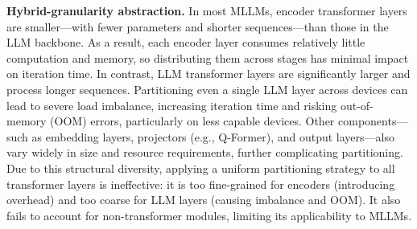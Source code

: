 \documentclass[conference]{IEEEtran}
\begin{document}
\textbf{Hybrid-granularity abstraction.}
In most MLLMs, encoder transformer layers are smaller—with fewer parameters and shorter sequences—than those in the LLM backbone. As a result, each encoder layer consumes relatively little computation and memory, so distributing them across stages has minimal impact on iteration time.
In contrast, LLM transformer layers are significantly larger and process longer sequences. Partitioning even a single LLM layer across devices can lead to severe load imbalance, increasing iteration time and risking out-of-memory (OOM) errors, particularly on less capable devices.
Other components—such as embedding layers, projectors (e.g., Q-Former), and output layers—also vary widely in size and resource requirements, further complicating partitioning.
Due to this structural diversity, applying a uniform partitioning strategy to all transformer layers is ineffective: it is too fine-grained for encoders (introducing overhead) and too coarse for LLM layers (causing imbalance and OOM). It also fails to account for non-transformer modules, limiting its applicability to MLLMs.
\end{document}

